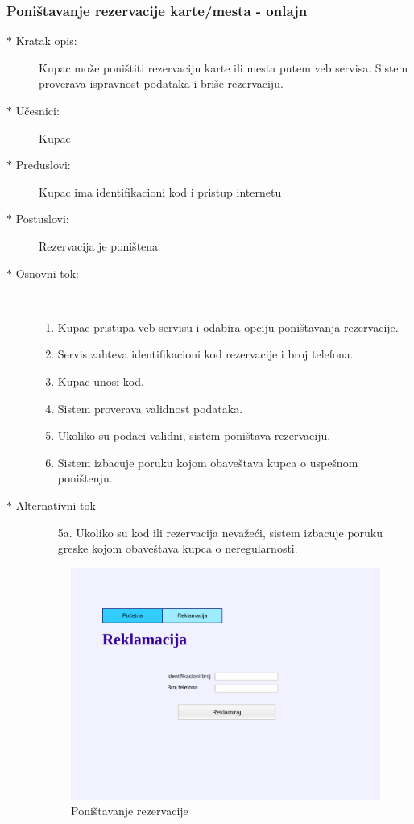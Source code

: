 \subsubsection{Poni\v stavanje rezervacije karte/mesta - onlajn}
\begin{description}
  \item[$\ast$ Kratak opis: ] Kupac mo\v ze poni\v stiti rezervaciju karte ili mesta putem veb servisa. 
			 	Sistem proverava ispravnost podataka i bri\v se rezervaciju.
  \item[$\ast$ U\v cesnici: ] Kupac
  \item[$\ast$ Preduslovi: ] Kupac ima identifikacioni kod i pristup internetu
  \item[$\ast$ Postuslovi: ] Rezervacija je poni\v stena
  \item[$\ast$ Osnovni tok: ] \ \\
  \begin{enumerate}
    \item Kupac pristupa veb servisu i odabira opciju poni\v stavanja rezervacije.
    \item Servis zahteva identifikacioni kod rezervacije i broj telefona.
    \item Kupac unosi kod.
    \item Sistem proverava validnost podataka.
    \item Ukoliko su podaci validni, sistem poni\v stava rezervaciju.
    \item Sistem izbacuje poruku kojom obave\v stava kupca o uspe\v snom poni\v stenju.
  \end{enumerate}
  \item[$\ast$ Alternativni tok]
  \begin{enumerate}
    \item[5a. ]  Ukoliko su kod ili rezervacija neva\v ze\'ci, sistem izbacuje poruku greske kojom obave\v stava kupca o neregularnosti. 

  \end{enumerate}
\clearpage  
\begin{figure}[h!tb] 
	\centering
	\includegraphics[width=1.2\linewidth]{../Slike/Veb/reklamacija.png}
	\caption{Poni\v stavanje rezervacije}
\label{fig:reklamacija}
\end{figure}
\end{description}


